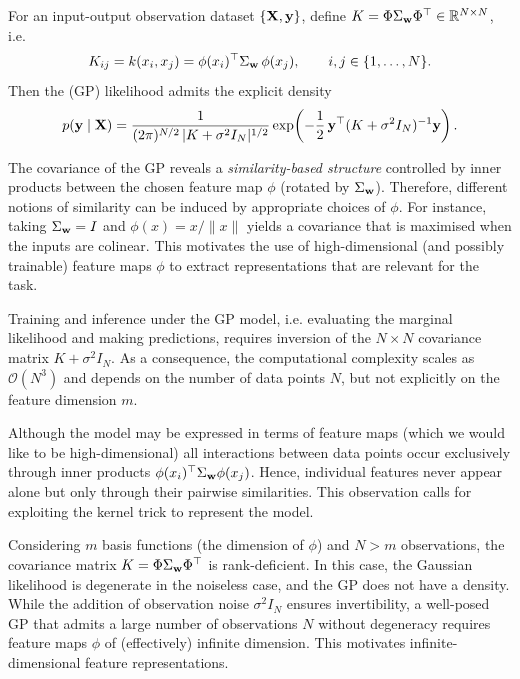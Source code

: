 For an input-output observation dataset \(\{{ \mathbf{X}},{ \mathbf{y}}\}\), define \(K= \Phi\Sigma_{{ \mathbf{w}}}\Phi^\top \in\mathbb R^{N\times N}\), i.e.
\[
K_{ij}=k(x_i,x_j)=\phi(x_i)^\top \Sigma_{{ \mathbf{w}}}\,\phi(x_j),
\qquad i,j\in\{1,\ldots,N\}.
\]
Then the (GP) likelihood admits the explicit density
\begin{equation}
    p({ \mathbf{y}}\mid { \mathbf{X}})
=
\frac{1}{(2\pi)^{N/2}\,|K+\sigma^2 I_N|^{1/2}}
\exp\!\left(
-\frac{1}{2}\,{ \mathbf{y}}^\top (K+\sigma^2 I_N)^{-1}{ \mathbf{y}}
\right).    
\label{eq:GP_likelihood}
\end{equation}

\begin{remark}
The covariance of the GP reveals a \emph{similarity-based structure} controlled by inner products between the chosen feature map \(\phi\) (rotated by \(\Sigma_{{ \mathbf{w}}}\)). Therefore, different notions of similarity can be induced by appropriate choices of \(\phi\). 
For instance, taking \(\Sigma_{{ \mathbf{w}}}=I\) and \(\phi(x)=x/\|x\|\) yields a covariance that is maximised when the inputs are colinear. 
This motivates the use of high-dimensional (and possibly trainable) feature maps \(\phi\) to extract representations that are relevant for the task.
\end{remark}

\begin{remark}
Training and inference under the GP model, i.e. evaluating the marginal likelihood and making predictions, requires inversion of the \(N\times N\) covariance matrix \(K+\sigma^2 I_N\). 
As a consequence, the computational complexity scales as \(\mathcal O(N^3)\) and depends on the number of data points \(N\), but not explicitly on the feature dimension \(m\).
\end{remark}

\begin{remark}
Although the model may be expressed in terms of feature maps (which we would like to be high-dimensional) all interactions between data points occur exclusively through inner products
\(\phi(x_i)^\top \Sigma_{{ \mathbf{w}}}\phi(x_j)\).
Hence, individual features never appear alone but only through their pairwise similarities. This observation calls for exploiting the kernel trick to represent the model.
\end{remark}

\begin{remark}
Considering \(m\) basis functions (the dimension of $\phi$) and \(N>m\) observations, the covariance matrix \(K=\Phi\Sigma_{{ \mathbf{w}}}\Phi^\top\) is rank-deficient.
In this case, the Gaussian likelihood is degenerate in the noiseless case, and the GP does not have a density.
While the addition of observation noise \(\sigma^2 I_N\) ensures invertibility, a well-posed GP that admits a large number of observations \(N\) without degeneracy requires feature maps \(\phi\) of (effectively) infinite dimension.
This motivates infinite-dimensional feature representations.
\end{remark}


